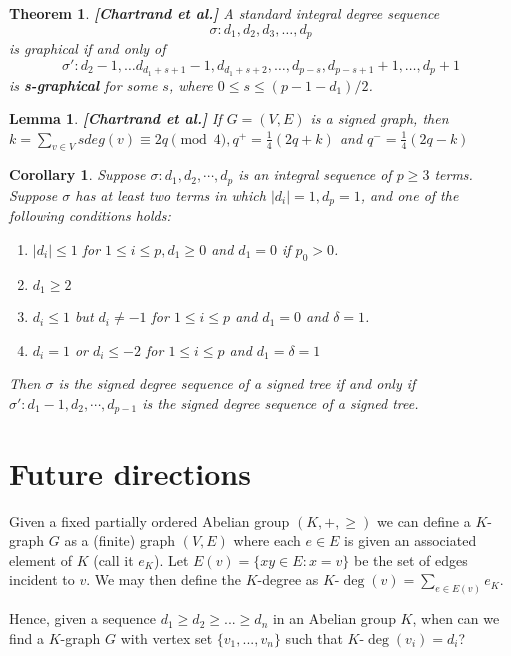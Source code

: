 \documentclass{article}
\newtheorem{theorem}{Theorem}
\newtheorem{lemma}{Lemma}
\newtheorem{corollary}{Corollary}
\begin{document}
\addtocounter{theorem}{-6}

\begin{theorem}
    \textbf{[Chartrand et al.]} A standard integral degree sequence 
    \begin{equation*}
        \sigma: d_1,d_2,d_3,\ldots, d_p
    \end{equation*}
    is graphical if and only of 
    \begin{equation*}
        \sigma':d_2-1,\ldots d_{d_1+s+1}-1,d_{d_1+s+2},\ldots, d_{p-s},d_{p-s+1}+1,\ldots,d_p+1
    \end{equation*}
    is \textbf{s-graphical} for some $s$, where $0 \leq s \leq (p - 1 - d_1)/2$.
\end{theorem}

\addtocounter{lemma}{2}

\begin{lemma}    \textbf{[Chartrand et al.]} If \(G = (V, E)\) is a signed graph, then \(k=\sum_{v\in V} sdeg(v)\equiv 2q \pmod{4}, q^+ = \frac{1}{4} (2q+k)\) and \(q^- = \frac{1}{4} (2q-k)\)
\end{lemma}

\addtocounter{corollary}{7}

\begin{corollary}
    Suppose \(\sigma: d_1, d_2, \cdots, d_p\) is an integral sequence of \(p\ge 3\) terms. Suppose \(\sigma\) has at least two terms in which \(|d_i| = 1, d_p = 1\), and one of the following conditions holds:
    \begin{enumerate}
        \item \(|d_i| \le 1\) for \(1\le i\le p, d_1\ge 0\) and \(d_1 = 0\) if \(p_0 > 0\).
        \item \(d_1 \ge 2\)
        \item \(d_i\le 1\) but \(d_i \ne -1\) for \(1\le i\le p\) and \(d_1 = 0\) and \(\delta =1\).
        \item \(d_i = 1\) or \(d_i\le -2\) for \(1\le i\le p\) and \(d_1 = \delta = 1\)
    \end{enumerate}
    Then \(\sigma\) is the signed degree sequence of a signed tree if and only if \(\sigma': d_1 -1 , d_2, \cdots,d_{p-1}\) is the signed degree sequence of a signed tree.
\end{corollary}

\section{Future directions}

Given a fixed partially ordered Abelian group $(K, +, \geq)$ we can define a $K$-graph $G$ as a (finite) graph $(V,E)$ where each $e \in E$ is given an associated element of $K$ (call it $e_K$). Let $E(v) = \{ xy \in E : x = v \}$ be the set of edges incident to $v$. We may then define the $K$-degree as $K\text{-}\deg(v) = \sum_{e \in E(v)} e_K$. 

Hence, given a sequence $d_1 \geq d_2 \geq ... \geq d_n$ in an Abelian group $K$, when can we find a $K$-graph $G$ with vertex set $\{ v_1, ..., v_n \}$ such that $K\text{-}\deg(v_i) = d_i$? 




\nocite{*}


\end{document}
